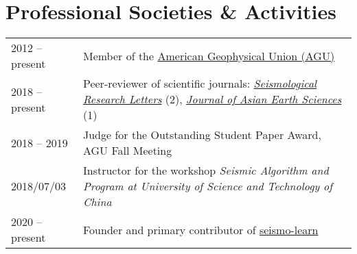 \section*{Professional Societies \& Activities}

\newcommand{\tabitem}{~~\llap{\textbullet}~~}

\begin{tabular}{p{} p{}}
2012 -- present & Member of the \href{https://sites.agu.org/}{American Geophysical Union (AGU)} \\
2018 -- present & Peer-reviewer of scientific journals:
                  \textit{\href{https://pubs.geoscienceworld.org/srl/}{Seismological Research Letters}} (2),
                  \textit{\href{https://www.journals.elsevier.com/journal-of-asian-earth-sciences/}{Journal of Asian Earth Sciences}} (1) \\
2018 -- 2019 & Judge for the Outstanding Student Paper Award, AGU Fall Meeting \\
2018/07/03   & Instructor for the workshop \textit{Seismic Algorithm and Program at University of Science and Technology of China} \\
2020 -- present & Founder and primary contributor of \href{https://seismo-learn.org/}{seismo-learn} \\
\end{tabular}
